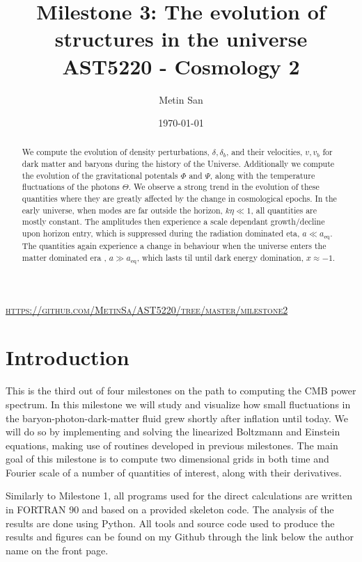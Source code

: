 \documentclass[a4paper, 10pt, reqno]{amsart}
\title[Milestone 3]{\Large{Milestone 3: The evolution of structures in the universe} \\
\normalsize{AST5220 - Cosmology 2}}
\author[San]{Metin San}
\date{\today}
\begin{document}
\maketitle
\begin{center}
   \vspace*{-0.6cm} \textsc{\url{https://github.com/MetinSa/AST5220/tree/master/milestone2}}
\end{center}

\begin{abstract}
We compute the evolution of density perturbations, $\delta, \delta_b$, and their velocities, $v, v_b$ for dark matter and baryons during the history of the Universe. Additionally we compute the evolution of the gravitational potentals $\Phi$ and $\Psi$, along with the temperature fluctuations of the photons $\Theta$. We observe a strong trend in the evolution of these quantities where they are greatly affected by the change in cosmological epochs. In the early universe, when modes are far outside the horizon, $k\eta \ll 1$, all quantities are mostly constant. The amplitudes then experience a scale dependant growth/decline upon horizon entry, which is suppressed during the radiation dominated eta, $a \ll a_\mathrm{eq}$. The quantities again experience a change in behaviour when the universe enters the matter dominated era , $a \gg a_\mathrm{eq}$, which lasts til until dark energy domination, $x \approx -1$. 
\end{abstract}

\section{Introduction}
This is the third out of four milestones on the path to computing the CMB power spectrum. In this milestone we will study and visualize how small fluctuations in the baryon-photon-dark-matter fluid grew shortly after inflation until today. We will do so by implementing and solving the linearized Boltzmann and Einstein equations, making use of routines developed in previous milestones. The main goal of this milestone is to compute two dimensional grids in both time and Fourier scale of a number of quantities of interest, along with their derivatives.

Similarly to Milestone 1, all programs used for the direct calculations are written in FORTRAN 90 and based on a provided skeleton code. The analysis of the results are done using Python. All tools and source code used to produce the results and figures can be found on my Github through the link below the author name on the front page.
\end{document}
